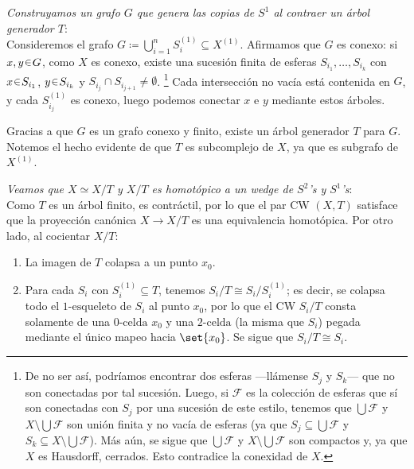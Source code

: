 \begin{sol}[Demostración]
\emph{Construyamos un grafo $G$ que genera las copias de $S^1$ al contraer un árbol generador $T$}:\\
Consideremos el grafo $G \coloneqq \bigcup_{i=1}^n S^{(1)}_i \subseteq X^{(1)}$. Afirmamos que $G$ es conexo: si $x, y \en G$, como $X$ es conexo, existe una sucesión finita de esferas $S_{i_1}, \dots, S_{i_k}$ con $x \en S_{i_1}$, $y \en S_{i_k}$ y $S_{i_j} \cap S_{i_{j+1}} \neq \emptyset$.%
\footnote{
    De no ser así, podríamos encontrar dos esferas ---llámense $S_j$ y $S_k$--- que no son conectadas por tal sucesión. Luego, si $\mathcal{F}$ es la colección de esferas que sí son conectadas con $S_j$ por una sucesión de este estilo, tenemos que $\bigcup\mathcal{F}$ y $X\setminus\bigcup\mathcal{F}$ son unión finita y no vacía de esferas (ya que $S_j \subseteq \bigcup\mathcal{F}$ y $S_k \subseteq X\setminus\bigcup\mathcal{F}$). Más aún, se sigue que $\bigcup\mathcal{F}$ y $X\setminus\bigcup\mathcal{F}$ son compactos y, ya que $X$ es Hausdorff, cerrados. Esto contradice la conexidad de $X$.
}
Cada intersección no vacía está contenida en $G$, y cada $S^{(1)}_{i_j}$ es conexo, luego podemos conectar $x$ e $y$ mediante estos árboles.

Gracias a que $G$ es un grafo conexo y finito, existe un árbol generador $T$ para $G$. Notemos el hecho evidente de que $T$ es subcomplejo de $X$, ya que es subgrafo de $X^{(1)}$.\vspace{1em}

\emph{Veamos que $X \simeq X/T$ y $X/T$ es homotópico a un wedge de $S^2$'s y $S^1$'s}:\\
Como $T$ es un árbol finito, es contráctil, por lo que el par CW $(X,T)$ satisface que la proyección canónica $X \to X/T$ es una equivalencia homotópica. Por otro lado, al cocientar $X/T$:
\begin{enumerate}[label = (\roman*), leftmargin=1.2em]
\item La imagen de $T$ colapsa a un punto $x_0$.

\item Para cada $S_i$ con $S^{(1)}_i \subseteq T$, tenemos $S_i/T \cong S_i/S^{(1)}_i$; es decir, se colapsa todo el $1\text{-esqueleto}$ de $S_i$ al punto $x_0$, por lo que el CW $S_i/T$ consta solamente de una $0\text{-celda}$ $x_0$ y una $2\text{-celda}$ (la misma que $S_i$) pegada mediante el único mapeo hacia $\set{x_0}$. Se sigue que $S_i/T \cong S_i$.


\end{enumerate}
\end{sol}
